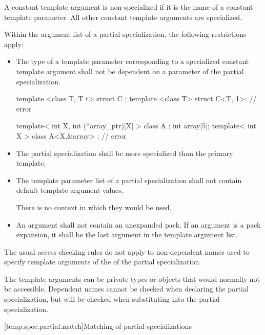 \pnum
A constant template argument is non-specialized if it is the name of a constant
template parameter.
All other constant template arguments are specialized.

\pnum
Within the argument list of a partial specialization,
the following restrictions apply:

\begin{itemize}
\item
The type of a template parameter corresponding to a specialized constant template
argument shall not be dependent on a parameter of the partial specialization.
\begin{example}
\begin{codeblock}
template <class T, T t> struct C {};
template <class T> struct C<T, 1>;              // error

template< int X, int (*array_ptr)[X] > class A {};
int array[5];
template< int X > class A<X,&array> { };        // error
\end{codeblock}

\end{example}
\item
The partial specialization shall be more specialized than the primary
template.

\item
The template parameter list of a partial specialization shall not contain default
template argument values.
\begin{footnote}
There is no context in which they would be used.
\end{footnote}
\item
An argument shall not contain an unexpanded pack. If
an argument is a pack expansion, it shall be
the last argument in the template argument list.
\end{itemize}

\pnum
The usual access checking rules do not apply to non-dependent names
used to specify template arguments of the 
of the partial specialization.
\begin{note}
The template arguments can be private types or
objects that would normally not be accessible.
Dependent names cannot be checked when declaring the partial specialization,
but will be checked when substituting into the partial specialization.
\end{note}

[temp.spec.partial.match]{Matching of partial specializations}

